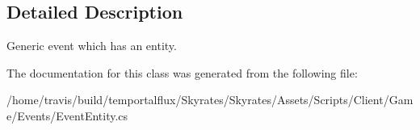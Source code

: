 \subsection{Detailed Description}
Generic event which has an entity. 



The documentation for this class was generated from the following file\-:\begin{DoxyCompactItemize}
\item 
/home/travis/build/temportalflux/\-Skyrates/\-Skyrates/\-Assets/\-Scripts/\-Client/\-Game/\-Events/Event\-Entity.\-cs\end{DoxyCompactItemize}
